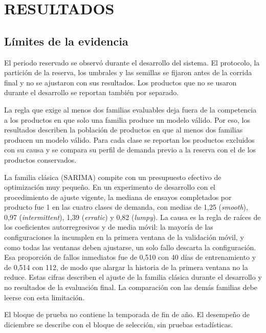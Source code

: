\section{RESULTADOS}


\subsection{Límites de la evidencia}
El periodo reservado se observó durante el desarrollo del sistema. El protocolo, la partición de la reserva, los umbrales y las semillas se fijaron antes de la corrida final y no se ajustaron con sus resultados. Los productos que no se usaron durante el desarrollo se reportan también por separado.

La regla que exige al menos dos familias evaluables deja fuera de la competencia a los productos en que solo una familia produce un modelo válido. Por eso, los resultados describen la población de productos en que al menos dos familias producen un modelo válido. Para cada clase se reportan los productos excluidos con su causa y se compara su perfil de demanda previo a la reserva con el de los productos conservados.

La familia clásica (SARIMA) compite con un presupuesto efectivo de optimización muy pequeño. En un experimento de desarrollo con el procedimiento de ajuste vigente, la mediana de ensayos completados por producto fue 1 en las cuatro clases de demanda, con medias de 1,25 (\textit{smooth}), 0,97 (\textit{intermittent}), 1,39 (\textit{erratic}) y 0,82 (\textit{lumpy}). La causa es la regla de raíces de los coeficientes autorregresivos y de media móvil: la mayoría de las configuraciones la incumplen en la primera ventana de la validación móvil, y como todas las ventanas deben ajustarse, un solo fallo descarta la configuración. Esa proporción de fallos inmediatos fue de 0,510 con 40 días de entrenamiento y de 0,514 con 112, de modo que alargar la historia de la primera ventana no la reduce. Estas cifras describen el ajuste de la familia clásica durante el desarrollo y no resultados de la evaluación final. La comparación con las demás familias debe leerse con esta limitación.

El bloque de prueba no contiene la temporada de fin de año. El desempeño de diciembre se describe con el bloque de selección, sin pruebas estadísticas.
